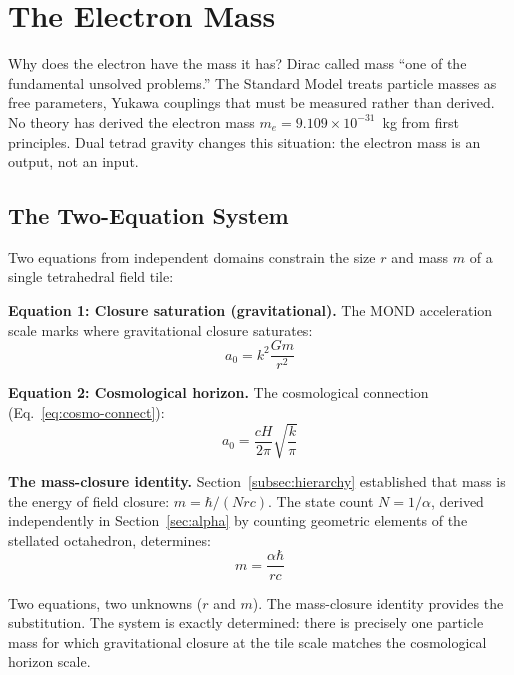 \documentclass[aps,prd,preprint,superscriptaddress,showpacs,preprintnumbers,amsmath,amssymb,nofootinbib]{revtex4-2}
\begin{document}
\section{The Electron Mass}
\label{sec:electron-mass}

Why does the electron have the mass it has? Dirac called mass ``one of the fundamental unsolved problems.'' The Standard Model treats particle masses as free parameters, Yukawa couplings that must be measured rather than derived. No theory has derived the electron mass $m_e = 9.109 \times 10^{-31}$~kg from first principles. Dual tetrad gravity changes this situation: the electron mass is an output, not an input.

\subsection{The Two-Equation System}
\label{subsec:two-eq}

Two equations from independent domains constrain the size $r$ and mass $m$ of a single tetrahedral field tile:

\textbf{Equation 1: Closure saturation (gravitational).} The MOND acceleration scale marks where gravitational closure saturates:
\begin{equation}
a_0 = k^2 \frac{Gm}{r^2}
\label{eq:closure-sat}
\end{equation}

\textbf{Equation 2: Cosmological horizon.} The cosmological connection (Eq.~\ref{eq:cosmo-connect}):
\begin{equation}
a_0 = \frac{cH}{2\pi} \sqrt{\frac{k}{\pi}}
\end{equation}

\textbf{The mass-closure identity.} Section~\ref{subsec:hierarchy} established that mass is the energy of field closure: $m = \hbar/(Nrc)$. The state count $N = 1/\alpha$, derived independently in Section~\ref{sec:alpha} by counting geometric elements of the stellated octahedron, determines:
\begin{equation}
m = \frac{\alpha \hbar}{rc}
\label{eq:quantum-em}
\end{equation}

Two equations, two unknowns ($r$ and $m$). The mass-closure identity provides the substitution. The system is exactly determined: there is precisely one particle mass for which gravitational closure at the tile scale matches the cosmological horizon scale.
\end{document}
